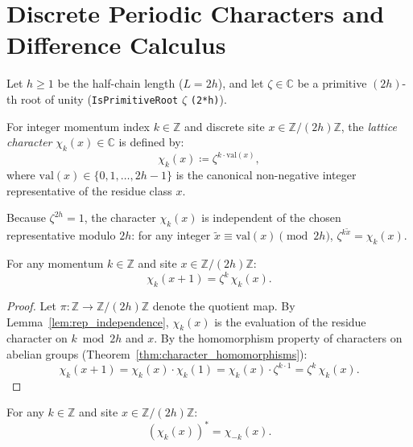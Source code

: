 \section{Discrete Periodic Characters and Difference Calculus}

Let $h \ge 1$ be the half-chain length ($L = 2h$), and let $\zeta \in \mathbb{C}$ be a primitive $(2h)$-th root of unity (\texttt{IsPrimitiveRoot} $\zeta$ \texttt{(2*h)}).

\begin{definition}
For integer momentum index $k \in \mathbb{Z}$ and discrete site $x \in \mathbb{Z}/(2h)\mathbb{Z}$, the \emph{lattice character} $\chi_k(x) \in \mathbb{C}$ is defined by:
\begin{equation}
\chi_k(x) \coloneqq \zeta^{k \cdot \mathrm{val}(x)},
\end{equation}
where $\mathrm{val}(x) \in \{0, 1, \dots, 2h-1\}$ is the canonical non-negative integer representative of the residue class $x$.
\end{definition}

Because $\zeta^{2h} = 1$, the character $\chi_k(x)$ is independent of the chosen representative modulo $2h$: for any integer $\widetilde{x} \equiv \mathrm{val}(x) \pmod{2h}$, $\zeta^{k \widetilde{x}} = \chi_k(x)$.

\begin{lemma}
\label{lem:app_lattice_character_shift}
For any momentum $k \in \mathbb{Z}$ and site $x \in \mathbb{Z}/(2h)\mathbb{Z}$:
\begin{equation}
\chi_k(x + 1) = \zeta^k\, \chi_k(x).
\end{equation}
\end{lemma}

\begin{proof}
Let $\pi : \mathbb{Z} \to \mathbb{Z}/(2h)\mathbb{Z}$ denote the quotient map. By Lemma~\ref{lem:rep_independence}, $\chi_k(x)$ is the evaluation of the residue character on $k \bmod 2h$ and $x$. By the homomorphism property of characters on abelian groups (Theorem~\ref{thm:character_homomorphisms}):
\[
\chi_k(x + 1) = \chi_k(x) \cdot \chi_k(1) = \chi_k(x) \cdot \zeta^{k \cdot 1} = \zeta^k\, \chi_k(x).
\]
\end{proof}

\begin{lemma}
\label{lem:app_lattice_character_conj}
For any $k \in \mathbb{Z}$ and site $x \in \mathbb{Z}/(2h)\mathbb{Z}$:
\begin{equation}
\left( \chi_k(x) \right)^* = \chi_{-k}(x).
\end{equation}
\end{lemma}

